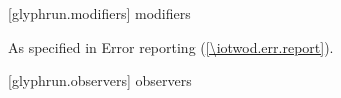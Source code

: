  [glyphrun.modifiers] { modifiers}

\begin{itemdecl}
\end{itemdecl}
\begin{itemdescr}
\pnum
\effects

\pnum
\throws
As specified in Error reporting (\ref{\iotwod.err.report}).

\pnum
\remarks

\pnum
\errors

\pnum
\realnotes

\end{itemdescr}

 [glyphrun.observers] { observers}

\begin{itemdecl}
\end{itemdecl}
\begin{itemdescr}
\pnum
\returns

\end{itemdescr}
